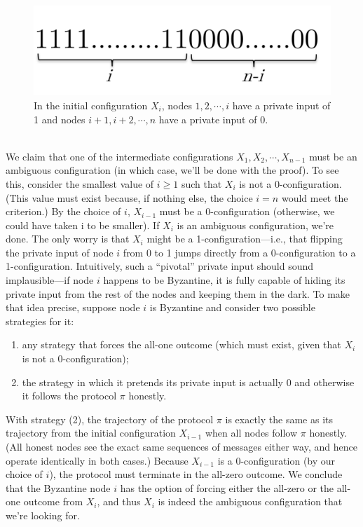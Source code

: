 \begin{figure}[h]
    \centering
    \includegraphics[scale = 0.5]{figures/f15.png}
    \caption{ In the initial configuration $X_i$, nodes $1, 2, \cdots, i$ have a private input of 1 and nodes $i + 1, i + 2, \cdots, n$ have a private input of 0.}
    \label{fig:mesh1}
\end{figure}\\

We claim that one of the intermediate configurations $X_1, X_2, \cdots, X_{n−1}$ must be an ambiguous configuration (in which case, we’ll be done with the proof). To see this, consider the smallest value of $i \geq 1$ such that $X_i$
is not a 0-configuration. (This value must exist because,
if nothing else, the choice $i = n$ would meet the criterion.) By the choice of $i$, $X_{i−1}$ must be
a 0-configuration (otherwise, we could have taken i to be smaller).
If $X_i$ is an ambiguous configuration, we’re done. The only worry is that $X_i$ might be
a 1-configuration—i.e., that flipping the private input of node $i$ from 0 to 1 jumps directly
from a 0-configuration to a 1-configuration. Intuitively, such a “pivotal” private input should
sound implausible—if node $i$ happens to be Byzantine, it is fully capable of hiding its private
input from the rest of the nodes and keeping them in the dark. To make that idea precise,
suppose node $i$ is Byzantine and consider two possible strategies for it:\\
\begin{enumerate}
    \item any strategy that forces the all-one outcome (which must exist, given that $X_i$ is not a 0-configuration);
    \item the strategy in which it pretends its private input is actually 0 and otherwise it follows the protocol $\pi$ honestly.
\end{enumerate}
With strategy (2), the trajectory of the protocol $\pi$ is exactly the same as its trajectory from
the initial configuration $X_{i−1}$ when all nodes follow $\pi$ honestly. (All honest nodes see the
exact same sequences of messages either way, and hence operate identically in both cases.)
Because $X_{i−1}$ is a 0-configuration (by our choice of $i$), the protocol must terminate in the
all-zero outcome. We conclude that the Byzantine node $i$ has the option of forcing either the
all-zero or the all-one outcome from $X_i$, and thus $X_i$ is indeed the ambiguous configuration that we’re looking for.

